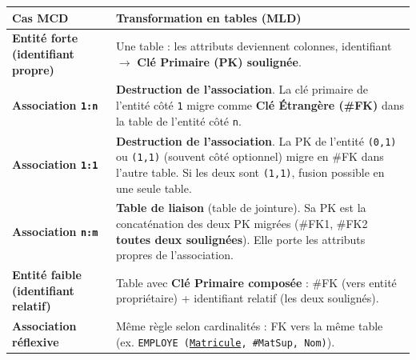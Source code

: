 \documentclass[11pt]{article}
\begin{document}
\begin{propriete}
\begin{center}
\begin{tabularx}{\linewidth}{|>{\bfseries}l|X|}\hline
\textbf{Cas MCD} & \textbf{Transformation en tables (MLD)} \\\hline
Entité forte (identifiant propre) & Une table : les attributs deviennent colonnes, identifiant $\rightarrow$ \textbf{Clé Primaire (PK) soulignée}. \\\hline
Association \texttt{1:n} & \textbf{Destruction de l'association}. La clé primaire de l'entité côté \texttt{1} migre comme \textbf{Clé Étrangère (\#FK)} dans la table de l'entité côté \texttt{n}. \\\hline
Association \texttt{1:1} & \textbf{Destruction de l'association}. La PK de l'entité \texttt{(0,1)} ou \texttt{(1,1)} (souvent côté optionnel) migre en \#FK dans l'autre table. Si les deux sont \texttt{(1,1)}, fusion possible en une seule table. \\\hline
Association \texttt{n:m} & \textbf{Table de liaison} (table de jointure). Sa PK est la concaténation des deux PK migrées (\#FK1, \#FK2 \textbf{toutes deux soulignées}). Elle porte les attributs propres de l'association. \\\hline
Entité faible (identifiant relatif) & Table avec \textbf{Clé Primaire composée} : \#FK (vers entité propriétaire) + identifiant relatif (les deux soulignés). \\\hline
Association réflexive & Même règle selon cardinalités : FK vers la même table (ex. \texttt{EMPLOYE (\underline{Matricule}, \#MatSup, Nom)}). \\\hline
\end{tabularx}
\end{center}
\end{propriete}
\end{document}
